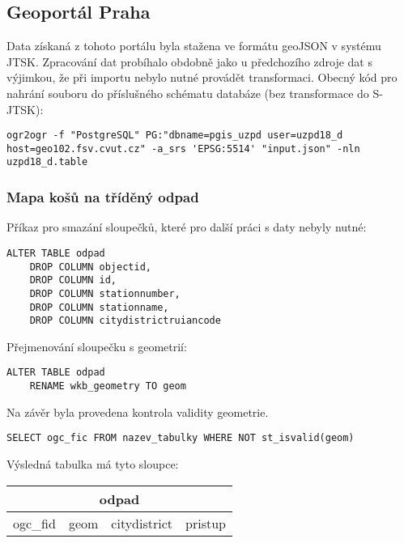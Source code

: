 \documentclass[a4paper, 12pt]{article}
\begin{document}
\subsection{Geoportál Praha}
Data získaná z tohoto portálu byla stažena ve formátu geoJSON v systému JTSK. Zpracování dat probíhalo obdobně jako u předchozího zdroje dat s výjimkou, že při importu nebylo nutné provádět transformaci. Obecný kód pro nahrání souboru do příslušného schématu databáze (bez transformace do S-JTSK): 
\begin{lstlisting}
ogr2ogr -f "PostgreSQL" PG:"dbname=pgis_uzpd user=uzpd18_d host=geo102.fsv.cvut.cz" -a_srs 'EPSG:5514' "input.json" -nln uzpd18_d.table
\end{lstlisting}

\subsubsection*{Mapa košů na tříděný odpad}
Příkaz pro smazání sloupečků, které pro další práci s daty nebyly nutné:
\begin{lstlisting}
ALTER TABLE odpad
    DROP COLUMN objectid,
    DROP COLUMN id,
    DROP COLUMN stationnumber,
    DROP COLUMN stationname,
    DROP COLUMN citydistrictruiancode
\end{lstlisting}
Přejmenování sloupečku s geometrií:
\begin{lstlisting}
ALTER TABLE odpad
    RENAME wkb_geometry TO geom
\end{lstlisting} 
Na závěr byla provedena kontrola validity geometrie. 
\begin{lstlisting}
SELECT ogc_fic FROM nazev_tabulky WHERE NOT st_isvalid(geom)
\end{lstlisting}
Výsledná tabulka má tyto sloupce:

\begin{table}[h!]
\centering
\begin{tabular}{|c|c|c|c|}
\hline
\multicolumn{4}{|c|}{\textbf{odpad}}     \\ \hline
ogc\_fid & geom & citydistrict & pristup \\ \hline
\end{tabular}
\end{table}
\end{document}
